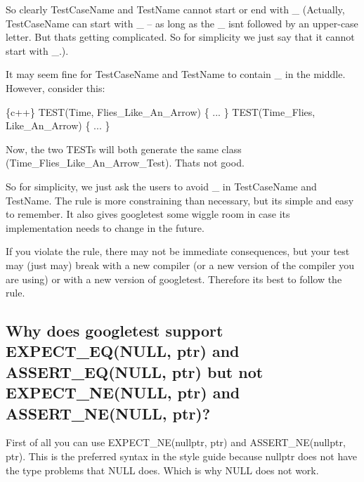 So clearly {\ttfamily Test\+Case\+Name} and {\ttfamily Test\+Name} cannot start or end with {\ttfamily \+\_\+} (Actually, {\ttfamily Test\+Case\+Name} can start with {\ttfamily \+\_\+} -- as long as the {\ttfamily \+\_\+} isn\textquotesingle{}t followed by an upper-\/case letter. But that\textquotesingle{}s getting complicated. So for simplicity we just say that it cannot start with {\ttfamily \+\_\+}.).

It may seem fine for {\ttfamily Test\+Case\+Name} and {\ttfamily Test\+Name} to contain {\ttfamily \+\_\+} in the middle. However, consider this\+:


\begin{DoxyCode}
\{c++\}
TEST(Time, Flies\_Like\_An\_Arrow) \{ ... \}
TEST(Time\_Flies, Like\_An\_Arrow) \{ ... \}
\end{DoxyCode}


Now, the two {\ttfamily T\+E\+ST}s will both generate the same class ({\ttfamily Time\+\_\+\+Flies\+\_\+\+Like\+\_\+\+An\+\_\+\+Arrow\+\_\+\+Test}). That\textquotesingle{}s not good.

So for simplicity, we just ask the users to avoid {\ttfamily \+\_\+} in {\ttfamily Test\+Case\+Name} and {\ttfamily Test\+Name}. The rule is more constraining than necessary, but it\textquotesingle{}s simple and easy to remember. It also gives googletest some wiggle room in case its implementation needs to change in the future.

If you violate the rule, there may not be immediate consequences, but your test may (just may) break with a new compiler (or a new version of the compiler you are using) or with a new version of googletest. Therefore it\textquotesingle{}s best to follow the rule.

\subsection*{Why does googletest support {\ttfamily E\+X\+P\+E\+C\+T\+\_\+\+E\+Q(\+N\+U\+L\+L, ptr)} and {\ttfamily A\+S\+S\+E\+R\+T\+\_\+\+E\+Q(\+N\+U\+L\+L, ptr)} but not {\ttfamily E\+X\+P\+E\+C\+T\+\_\+\+N\+E(\+N\+U\+L\+L, ptr)} and {\ttfamily A\+S\+S\+E\+R\+T\+\_\+\+N\+E(\+N\+U\+L\+L, ptr)}?}

First of all you can use {\ttfamily E\+X\+P\+E\+C\+T\+\_\+\+N\+E(nullptr, ptr)} and {\ttfamily A\+S\+S\+E\+R\+T\+\_\+\+NE(nullptr, ptr)}. This is the preferred syntax in the style guide because nullptr does not have the type problems that N\+U\+LL does. Which is why N\+U\+LL does not work.

